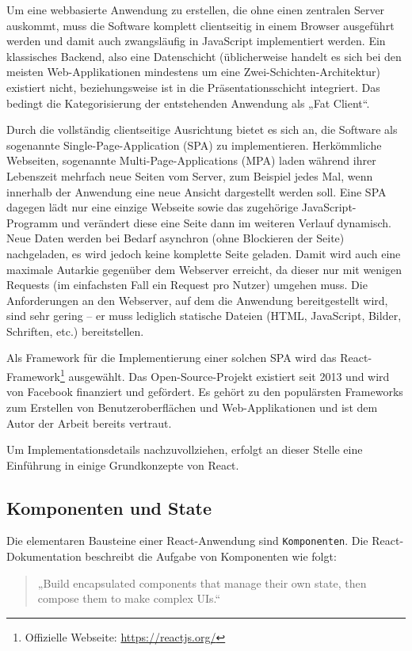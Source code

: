 Um eine webbasierte Anwendung zu erstellen, die ohne einen zentralen Server auskommt, muss die Software komplett clientseitig in einem Browser ausgeführt werden und damit auch zwangsläufig in JavaScript implementiert werden. Ein klassisches Backend, also eine Datenschicht (üblicherweise handelt es sich bei den meisten Web-Applikationen mindestens um eine Zwei-Schichten-Architektur) existiert nicht, beziehungsweise ist in die Präsentationsschicht integriert. Das bedingt die Kategorisierung der entstehenden Anwendung als „Fat Client“.

Durch die vollständig clientseitige Ausrichtung bietet es sich an, die Software als sogenannte Single-Page-Application (SPA) zu implementieren. Herkömmliche Webseiten, sogenannte Multi-Page-Applications (MPA) laden während ihrer Lebenszeit mehrfach neue Seiten vom Server, zum Beispiel jedes Mal, wenn innerhalb der Anwendung eine neue Ansicht dargestellt werden soll. Eine SPA dagegen lädt nur eine einzige Webseite sowie das zugehörige JavaScript-Programm und verändert diese eine Seite dann im weiteren Verlauf dynamisch. Neue Daten werden bei Bedarf asynchron (ohne Blockieren der Seite) nachgeladen, es wird jedoch keine komplette Seite geladen. Damit wird auch eine maximale Autarkie gegenüber dem Webserver erreicht, da dieser nur mit wenigen Requests (im einfachsten Fall ein Request pro Nutzer) umgehen muss. Die Anforderungen an den Webserver, auf dem die Anwendung bereitgestellt wird, sind sehr gering – er muss lediglich statische Dateien (HTML, JavaScript, Bilder, Schriften, etc.) bereitstellen.

Als Framework für die Implementierung einer solchen SPA wird das React-Framework\footnote{Offizielle Webseite: \url{https://reactjs.org/}} ausgewählt. Das Open-Source-Projekt existiert seit 2013 und wird von Facebook finanziert und gefördert. Es gehört zu den populärsten Frameworks zum Erstellen von Benutzeroberflächen und Web-Applikationen\cite{web:stackoverflow_umfrage} und ist dem Autor der Arbeit bereits vertraut.

Um Implementationsdetails nachzuvollziehen, erfolgt an dieser Stelle eine Einführung in einige Grundkonzepte von React.

\subsection{Komponenten und State}
Die elementaren Bausteine einer React-Anwendung sind \texttt{Komponenten}. Die React-Dokumentation beschreibt die Aufgabe von Komponenten wie folgt\cite{web:react}:
\begin{quote}
„Build encapsulated components that manage their own state, then compose them to make complex UIs.“
\end{quote}

